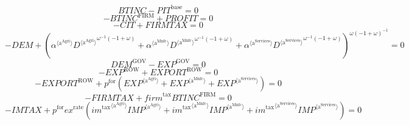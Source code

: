 \begin{equation}
{B\!T\!I\!N\!C} - {P\!I\!T}^{\mathrm{base}} = 0
\end{equation}
\begin{equation}
-{B\!T\!I\!N\!C}^{\mathrm{FIRM}} + {P\!R\!O\!F\!I\!T} = 0
\end{equation}
\begin{equation}
-{C\!I\!T} + {F\!I\!R\!M\!T\!A\!X} = 0
\end{equation}
\begin{equation}
-{D\!E\!M} + \left({{\alpha}^{\langle \mathrm{\mathrm{a}^{\mathrm{Agri}}}\rangle}} {{{D}^{\langle \mathrm{a}^{\mathrm{Agri}}\rangle}}^{{\omega}^{-1} \left(-1 + \omega\right)}} + {{\alpha}^{\langle \mathrm{\mathrm{a}^{\mathrm{Mnfc}}}\rangle}} {{{D}^{\langle \mathrm{a}^{\mathrm{Mnfc}}\rangle}}^{{\omega}^{-1} \left(-1 + \omega\right)}} + {{\alpha}^{\langle \mathrm{\mathrm{a}^{\mathrm{Services}}}\rangle}} {{{D}^{\langle \mathrm{a}^{\mathrm{Services}}\rangle}}^{{\omega}^{-1} \left(-1 + \omega\right)}}\right)^{{\omega} \left(-1 + \omega\right)^{-1}} = 0
\end{equation}
\begin{equation}
{D\!E\!M}^{\mathrm{GOV}} - {E\!X\!P}^{\mathrm{GOV}} = 0
\end{equation}
\begin{equation}
-{E\!X\!P}^{\mathrm{ROW}} + {E\!X\!P\!O\!R\!T}^{\mathrm{ROW}} = 0
\end{equation}
\begin{equation}
-{E\!X\!P\!O\!R\!T}^{\mathrm{ROW}} + {p^{\mathrm{for}}} \left({{E\!X\!P}}^{\langle \mathrm{a}^{\mathrm{Agri}}\rangle} + {{E\!X\!P}}^{\langle \mathrm{a}^{\mathrm{Mnfc}}\rangle} + {{E\!X\!P}}^{\langle \mathrm{a}^{\mathrm{Services}}\rangle}\right) = 0
\end{equation}
\begin{equation}
-{F\!I\!R\!M\!T\!A\!X} + {{f\!i\!r\!m}^{\mathrm{tax}}} {{B\!T\!I\!N\!C}^{\mathrm{FIRM}}} = 0
\end{equation}
\begin{equation}
-{I\!M\!T\!A\!X} + {p^{\mathrm{for}}} {{e\!x}^{\mathrm{rate}}} \left({{{i\!m}^{\mathrm{tax}}}^{\langle \mathrm{\mathrm{a}^{\mathrm{Agri}}}\rangle}} {{{I\!M\!P}}^{\langle \mathrm{a}^{\mathrm{Agri}}\rangle}} + {{{i\!m}^{\mathrm{tax}}}^{\langle \mathrm{\mathrm{a}^{\mathrm{Mnfc}}}\rangle}} {{{I\!M\!P}}^{\langle \mathrm{a}^{\mathrm{Mnfc}}\rangle}} + {{{i\!m}^{\mathrm{tax}}}^{\langle \mathrm{\mathrm{a}^{\mathrm{Services}}}\rangle}} {{{I\!M\!P}}^{\langle \mathrm{a}^{\mathrm{Services}}\rangle}}\right) = 0
\end{equation}
